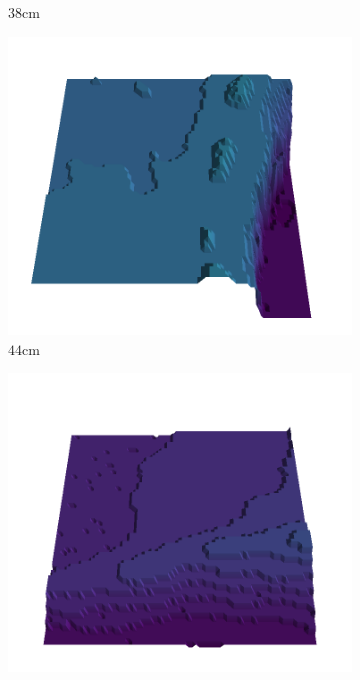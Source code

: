 \documentclass[../document.tex]{subfiles}
\begin{document}
\begin{figure}[htbp]
\begin{subfigure}[b]{0.19\textwidth}
    \caption{$38$cm}
    \end{subfigure}
    \begin{subfigure}[b]{0.19\textwidth}
    \includegraphics[width=\linewidth]{../img/5/quarry/all/best/44-patch-3d-majavi-colormap-2.png}
    \caption{$44$cm}
    \end{subfigure}
    \begin{subfigure}[b]{0.19\textwidth}
    \includegraphics[width=\linewidth]{../img/5/quarry/all/best/45-patch-3d-majavi-colormap-3.png}

\end{subfigure}
\end{figure}
\end{document}
